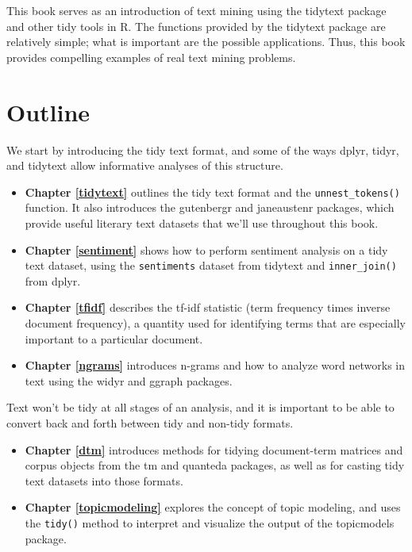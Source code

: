 \documentclass[
]{book}
\providecommand{\tightlist}{%
  \setlength{\itemsep}{0pt}\setlength{\parskip}{0pt}}
\begin{document}
This book serves as an introduction of text mining using the tidytext package and other tidy tools in R. The functions provided by the tidytext package are relatively simple; what is important are the possible applications. Thus, this book provides compelling examples of real text mining problems.

\hypertarget{outline}{%
\section*{Outline}\label{outline}}

We start by introducing the tidy text format, and some of the ways dplyr, tidyr, and tidytext allow informative analyses of this structure.

\begin{itemize}
\tightlist
\item
  \textbf{Chapter \ref{tidytext}} outlines the tidy text format and the \texttt{unnest\_tokens()} function. It also introduces the gutenbergr and janeaustenr packages, which provide useful literary text datasets that we'll use throughout this book.
\item
  \textbf{Chapter \ref{sentiment}} shows how to perform sentiment analysis on a tidy text dataset, using the \texttt{sentiments} dataset from tidytext and \texttt{inner\_join()} from dplyr.
\item
  \textbf{Chapter \ref{tfidf}} describes the tf-idf statistic (term frequency times inverse document frequency), a quantity used for identifying terms that are especially important to a particular document.
\item
  \textbf{Chapter \ref{ngrams}} introduces n-grams and how to analyze word networks in text using the widyr and ggraph packages.
\end{itemize}

Text won't be tidy at all stages of an analysis, and it is important to be able to convert back and forth between tidy and non-tidy formats.

\begin{itemize}
\tightlist
\item
  \textbf{Chapter \ref{dtm}} introduces methods for tidying document-term matrices and corpus objects from the tm and quanteda packages, as well as for casting tidy text datasets into those formats.
\item
  \textbf{Chapter \ref{topicmodeling}} explores the concept of topic modeling, and uses the \texttt{tidy()} method to interpret and visualize the output of the topicmodels package.
\end{itemize}
\end{document}
